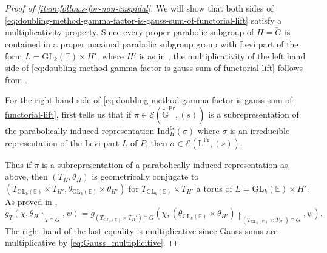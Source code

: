 \documentclass[12pt, reqno]{amsart}
\theoremstyle{definition}
\theoremstyle{definition}
\theoremstyle{definition}
\newcommand{\Ind}[3]{\mathrm{Ind}_{#1}^{#2}\left(#3\right)}
\newcommand{\GL}{\mathrm{GL}}
\newcommand{\GroupExtension}[1]{\widetilde{#1}}
\newcommand{\quadraticExtension}{\mathbb{E}}
\newcommand{\Frobenius}{\operatorname{Fr}}
\newcommand{\algebraicGroup}[1]{\boldsymbol{\mathrm{#1}}}
\newcommand{\LusztigSeries}[2]{\mathcal{E}\left(#1, (#2)\right)}
\begin{document}
\begin{proof}[Proof of \eqref{item:follows-for-non-cuspidal}]
	We will show that both sides of \eqref{eq:doubling-method-gamma-factor-is-gauss-sum-of-functorial-lift} satisfy a multiplicativity property. Since every proper parabolic subgroup of $H = \GroupExtension{G}$ is contained in a proper maximal parabolic subgroup group with Levi part of the form $L = \GL_k\left(\quadraticExtension\right) \times H'$, where $H'$ is as in , the multiplicativity of the left hand side of \eqref{eq:doubling-method-gamma-factor-is-gauss-sum-of-functorial-lift} follows from .
	
	For the right hand side of \eqref{eq:doubling-method-gamma-factor-is-gauss-sum-of-functorial-lift}, first  tells us that if $\pi \in \LusztigSeries{
		\GroupExtension{\algebraicGroup{G}}^{\Frobenius}}{s}$ is a subrepresentation of the parabolically induced representation $\Ind{H}{G}{\sigma}$ where $\sigma$ is an irreducible representation of the Levi part $L$ of $P$, then $\sigma \in \LusztigSeries{
		\algebraicGroup{L}^{\Frobenius}}{s}$.
		
	Thus if $\pi$ is a subrepresentation of a parabolically induced representation as above, then $(T_H,\theta_H)$ is geometrically conjugate to $(T_{\GL_k\left(\quadraticExtension\right)} \times T_{H'}, \theta_{\GL_k\left(\quadraticExtension\right)} \times \theta_{H'})$ for $T_{\GL_k\left(\quadraticExtension\right)} \times T_{H'}$ a torus of $L = \GL_k\left(\quadraticExtension\right) \times H'$. As proved in , $$g_{T}\left(\chi,\theta_H\restriction_{T \cap G},\psi\right) = g_{\left(T_{\GL_k\left(\quadraticExtension\right)} \times T_{H}'\right) \cap G}\left(\chi,\left(\theta_{\GL_k\left(\quadraticExtension\right)}\times \theta_{H'}\right)\restriction_{\left(T_{\GL_k\left(\quadraticExtension\right)} \times T_{H'}\right) \cap G},\psi\right).$$ The right hand of the last equality is multiplicative since Gauss sums are multiplicative by \eqref{eq:Gauss_multiplicitive}.
\end{proof}
\end{document}
